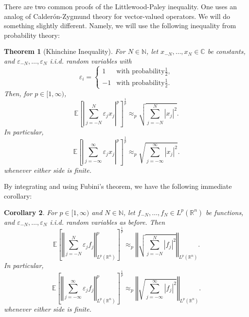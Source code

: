 \documentclass{book}
\newcommand{\bbC}{\mathbb{C}}
\newcommand{\bbE}{\mathbb{E}}
\newcommand{\bbN}{\mathbb{N}}
\newcommand{\bbR}{\mathbb{R}}
\renewcommand{\epsilon}{\varepsilon}
\newcommand{\abs}[1]{\left\lvert {#1} \right\rvert}
\newcommand{\norm}[1]{\left\Vert {#1} \right\Vert}
\newcommand{\bracks}[1]{\left[ {#1} \right]}
\newtheorem{theorem}{Theorem}[chapter]
\newtheorem{corollary}[theorem]{Corollary}
\theoremstyle{definition}
\theoremstyle{remark}
\numberwithin{equation}{chapter}
\begin{document}
There are two common proofs of the Littlewood-Paley inequality. One uses an analog of Calder\'on-Zygmund theory for vector-valued operators. We will do something slightly different. Namely, we will use the following inequality from probability theory:
\begin{theorem}[Khinchine Inequality]
    For $N \in \bbN$, let $x_{-N},\dots,x_N \in \bbC$ be constants, and $\epsilon_{-N},\dots,\epsilon_N$ i.i.d. random variables with 
    \begin{equation}
        \epsilon_i =
        \begin{cases}
            1 & \text{with probability} \frac{1}{2}, \\
            -1 & \text{with probability} \frac{1}{2}.
        \end{cases}
    \end{equation}
    Then, for $p \in [1,\infty)$,
    \begin{equation}
        \bbE\bracks{ \abs{ \sum_{j=-N}^N \epsilon_j x_j }^p }^{\frac{1}{p}} 
        \approx_p \sqrt{ \sum_{j=-N}^N \abs{x_j}^2 }.
    \end{equation}
    In particular,
    \begin{equation}
        \bbE\bracks{ \abs{ \sum_{j=-\infty}^\infty \epsilon_j x_j }^p }^{\frac{1}{p}} 
        \approx_p \sqrt{ \sum_{j=-\infty}^\infty \abs{x_j}^2 }.
    \end{equation}
    whenever either side is finite.
\end{theorem}
By integrating and using Fubini's theorem, we have the following immediate corollary:
\begin{corollary}
    For $p \in [1,\infty)$ and $N \in \bbN$, let $f_{-N},\dots,f_N \in L^p(\bbR^n)$ be functions, and $\epsilon_{-N},\dots,\epsilon_N$ i.i.d. random variables as before. Then 
    \begin{equation}
        \bbE\bracks{ \norm{ \sum_{j=-N}^N \epsilon_j f_j }_{L^p(\bbR^n)}^p }^\frac{1}{p}
        \approx_p \norm{ \sqrt{ \sum_{j=-N}^N \abs{f_j}^2 } }_{L^p(\bbR^n)}.
    \end{equation}
    In particular,
    \begin{equation}
        \bbE\bracks{ \norm{ \sum_{j=-\infty}^\infty \epsilon_j f_j }_{L^p(\bbR^n)}^p }^\frac{1}{p}
        \approx_p \norm{ \sqrt{ \sum_{j=-\infty}^\infty \abs{f_j}^2 } }_{L^p(\bbR^n)}.
    \end{equation}
    whenever either side is finite.
\end{corollary}
\end{document}
